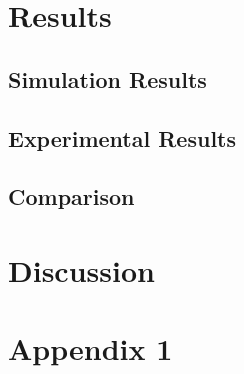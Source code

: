 \documentclass[a4paper,12pt]{article}
\begin{document}
\section{Results}

    \subsection{Simulation Results}

    \subsection{Experimental Results}

    \subsection{Comparison}

\section{Discussion}



\hypersetup{urlcolor=black}


\newpage


\appendix

\section{Appendix 1}
\end{document}

